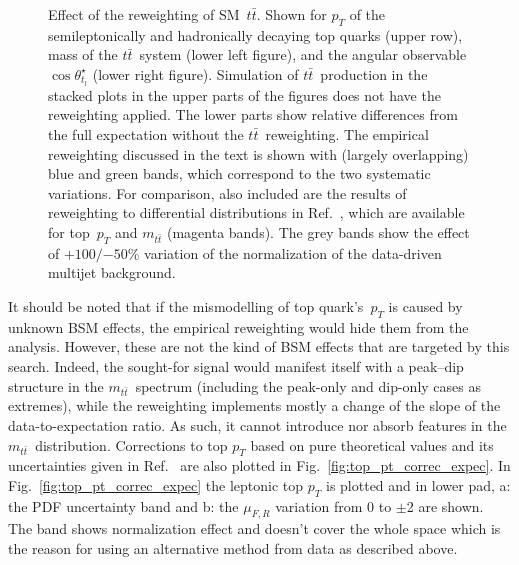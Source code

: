 \begin{figure}
  \caption{Effect of the reweighting of SM~$t\bar t$. Shown for $p_{T}$ of the semileptonically and hadronically decaying top quarks (upper row), mass of the $t\bar t$~system (lower left figure), and the angular observable $\cos\theta^{\star}_{t_{l}}$ (lower right figure). Simulation of $t\bar t$~production in the stacked plots in the upper parts of the figures does not have the reweighting applied. The lower parts show relative differences from the full expectation without the $t\bar t$~reweighting. The empirical reweighting discussed in the text is shown with (largely overlapping) blue and green bands, which correspond to the two systematic variations. For comparison, also included are the results of reweighting to differential distributions in Ref.~\cite{Czakon:2017wor}, which are available for top~$p_{T}$ and $m_{t\bar t}$ (magenta bands). The grey bands show the effect of ${+100} / {-50}$\% variation of the normalization of the data-driven multijet background.}
  \label{Fig:TopPtReweighting}
\end{figure}
It should be noted that if the mismodelling of top quark's~$p_{T}$ is caused by unknown BSM effects, the empirical reweighting would hide them from the analysis.
However, these are not the kind of BSM effects that are targeted by this search.
Indeed, the sought-for signal would manifest itself with a peak--dip structure in the $m_{t\bar t}$~spectrum (including the peak-only and dip-only cases as extremes), while the reweighting implements mostly a change of the slope of the data-to-expectation ratio.
As such, it cannot introduce nor absorb features in the $m_{t\bar t}$~distribution.
Corrections to top $p_{T}$ based on pure theoretical values and its uncertainties given in Ref.~\cite{Czakon:2017wor} are also plotted in Fig.~\ref{fig:top_pt_correc_expec}. In Fig.~\ref{fig:top_pt_correc_expec} the leptonic top $p_{T}$ is plotted and in lower pad, a: the PDF uncertainty band and b: the $\mu_{F,R}$ variation from 0 to $\pm$2 are shown. The band shows normalization effect and doesn't cover the whole space which is the reason for using an alternative method from data as described above.  
